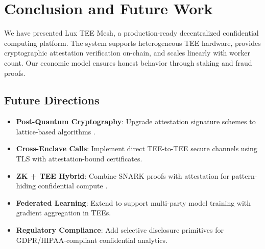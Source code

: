 \section{Conclusion and Future Work}


We have presented Lux TEE Mesh, a production-ready decentralized confidential computing platform. The system supports heterogeneous TEE hardware, provides cryptographic attestation verification on-chain, and scales linearly with worker count. Our economic model ensures honest behavior through staking and fraud proofs.

\subsection{Future Directions}

\begin{itemize}
  \item \textbf{Post-Quantum Cryptography}: Upgrade attestation signature schemes to lattice-based algorithms \cite{nist-pqc}.

  \item \textbf{Cross-Enclave Calls}: Implement direct TEE-to-TEE secure channels using TLS with attestation-bound certificates.

  \item \textbf{ZK + TEE Hybrid}: Combine SNARK proofs with attestation for pattern-hiding confidential compute \cite{zk-tee-hybrid}.

  \item \textbf{Federated Learning}: Extend to support multi-party model training with gradient aggregation in TEEs.

  \item \textbf{Regulatory Compliance}: Add selective disclosure primitives for GDPR/HIPAA-compliant confidential analytics.
\end{itemize}

